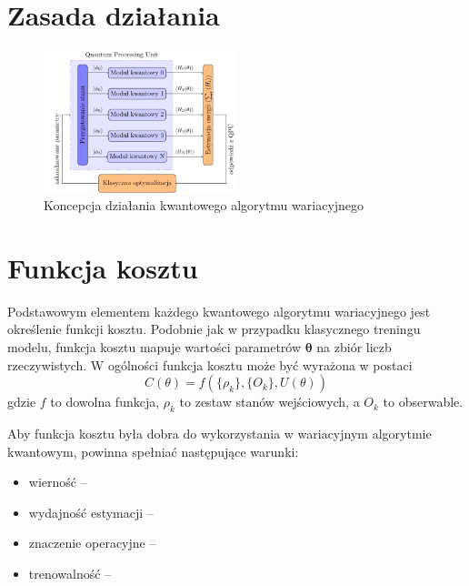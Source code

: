 \documentclass[a4paper,11pt]{article}
\begin{document}
\hypertarget{zasada-dzialania}{%
	\section{Zasada działania}\label{zasada-dzialania}}

\begin{figure}[h!]
	\centering
	\includegraphics[width=0.5\textwidth]{vqe-pl.pdf}
	\caption{Koncepcja działania kwantowego algorytmu wariacyjnego}
\end{figure}

\newpage 

\hypertarget{funkcja-kosztu}{%
	\section{Funkcja kosztu}\label{funkcja-kosztu}}

Podstawowym elementem każdego kwantowego algorytmu wariacyjnego jest określenie funkcji kosztu. Podobnie jak w przypadku klasycznego treningu modelu, funkcja kosztu mapuje wartości parametrów $\mathbf{\theta}$ na zbiór liczb rzeczywistych. W ogólności funkcja kosztu może być wyrażona w postaci
\begin{equation}
	C(\theta)  = f(\{\rho_k\}, \{O_k\}, U(\theta))
\end{equation}
gdzie $f$ to dowolna funkcja, $\rho_k$ to zestaw stanów wejściowych, a $O_k$ to obserwable.

Aby funkcja kosztu była dobra do wykorzystania w wariacyjnym algorytmie kwantowym, powinna spełniać następujące warunki:
\begin{itemize}
	\item wierność -- 
	\item wydajność estymacji -- 
	\item znaczenie operacyjne --
	\item trenowalność -- 
\end{itemize}
\end{document}
